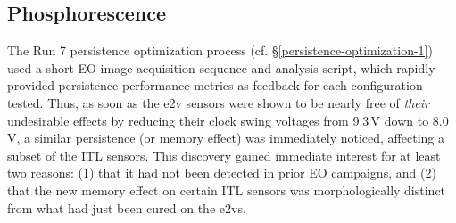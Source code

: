 %
%
%

%



\subsection{Phosphorescence}\label{phosphorescence}

The Run 7 persistence optimization process (cf. \S\ref{persistence-optimization-1}) used a short EO image acquisition sequence and analysis script, which rapidly provided persistence performance metrics as feedback for each configuration tested. Thus, as soon as the e2v sensors were shown to be nearly free of {\it their} undesirable effects by reducing their clock swing voltages from 9.3\,V down to 8.0\,V, a similar persistence (or memory effect) was immediately noticed, affecting a subset of the ITL sensors. This discovery gained immediate interest for at least two reasons: (1) that it had not been detected in prior EO campaigns, and (2) that the new memory effect on certain ITL sensors was morphologically distinct from what had just been cured on the e2vs. 

